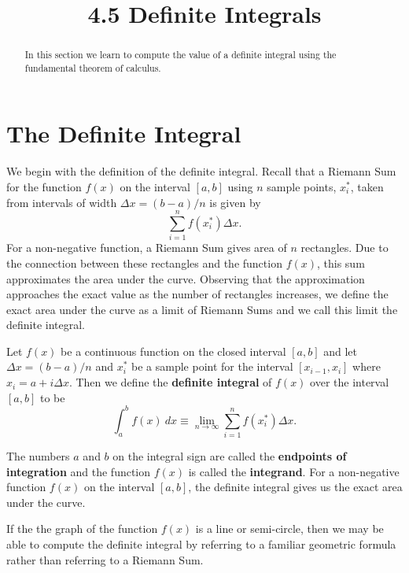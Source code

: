 \documentclass[handout]{ximera}
\title{4.5 Definite Integrals}
\begin{document}
\begin{abstract}
In this section we learn to compute the value of a definite integral using the fundamental theorem of calculus.
\end{abstract}

\maketitle



\section{The Definite Integral}

We begin with the definition of the definite integral.
Recall that a Riemann Sum for the function $f(x)$ on the interval $[a,b]$ using $n$ sample points, $x_i^*$, taken from intervals of width $\Delta x = (b-a)/n$ is given by
\[\sum_{i = 1}^n f(x_i^*)\Delta x.\]
For a non-negative function, a Riemann Sum gives area of $n$ rectangles. Due to the connection between these rectangles and the function $f(x)$,
this sum approximates the area under the curve.  Observing that the approximation approaches the exact value as the number of rectangles increases,
we define the exact area under the curve as a limit of Riemann Sums and we call this limit the definite integral.

\begin{definition}
Let $f(x)$ be a continuous function on the closed interval $[a,b]$ and let 
$\Delta x = (b-a)/n$ and $x_i^*$ be a sample point for the interval $[x_{i-1}, x_i]$ where $x_i = a+i\Delta x$. Then we define the \textbf{definite integral} of $f(x)$ over the interval $[a,b]$ to be
\[\int_a^b f(x) \ dx \equiv \lim_{n\to \infty} \sum_{i=1}^n f(x_i^*)\Delta x.\]
\end{definition} 
The numbers $a$ and $b$ on the integral sign
are called the \textbf{endpoints of integration} and the function $f(x)$ is called the \textbf{integrand}.  
For a non-negative function $f(x)$ on the interval $[a,b]$, the definite integral gives us the exact area under the curve.

If the the graph of the function $f(x)$ is a line or semi-circle, then we may be able to compute the definite integral 
by referring to a familiar geometric formula rather than referring to a Riemann Sum.

\end{document}
